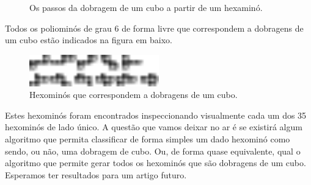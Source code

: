 \documentclass[11pt]{article}
\begin{document}
\begin{figure}[H]

  \caption{Os passos da dobragem de um cubo a partir de um hexaminó.}
\end{figure}


Todos os poliominós de grau 6 de forma livre que correspondem a
dobragens de um cubo estão indicados na figura em baixo.

\begin{figure}[H]
\centering
  \includegraphics[width=0.5\textwidth]{../images/poliominos-cubo.pdf}
\caption{Hexominós que correspondem a dobragens de um cubo.}
\end{figure}


Estes hexominós foram encontrados inspeccionando visualmente cada um
dos 35 hexominós de lado único. A questão que vamos deixar no ar é se
existirá algum algoritmo que permita classificar de forma simples um
dado hexominó como sendo, ou não, uma dobragem de cubo. Ou, de forma
quase equivalente, qual o algoritmo que permite gerar todos os
hexominós que são dobragens de um cubo. Esperamos ter resultados para
um artigo futuro.
\end{document}
